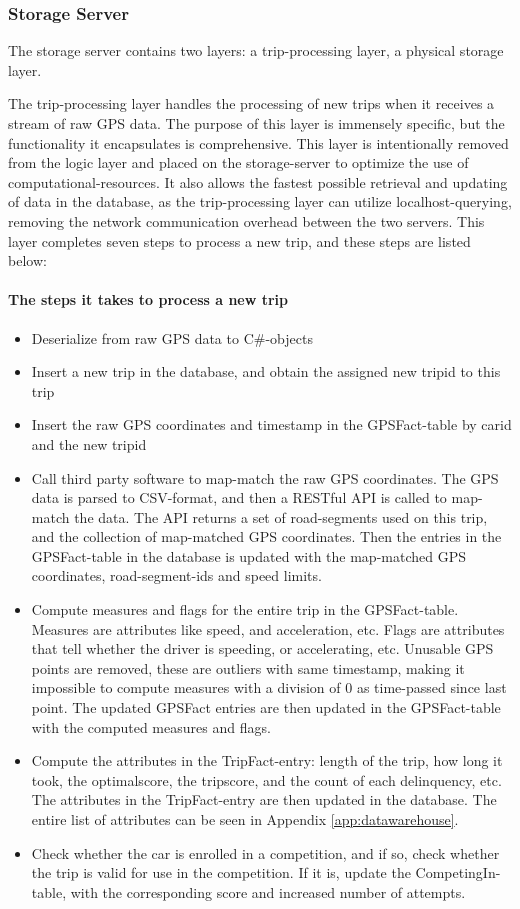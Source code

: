 \subsubsection{Storage Server}\label{subsec:storageserver}
The storage server contains two layers: a trip-processing layer, a physical storage layer.

The trip-processing layer handles the processing of new trips when it receives a stream of raw GPS data. The purpose of this layer is immensely specific, but the functionality it encapsulates is comprehensive. This layer is intentionally removed from the logic layer and placed on the storage-server to optimize the use of computational-resources. It also allows the fastest possible retrieval and updating of data in the database, as the trip-processing layer can utilize localhost-querying, removing the network communication overhead between the two servers. This layer completes seven steps to process a new trip, and these steps are listed below:

\paragraph{The steps it takes to process a new trip}
\begin{itemize}
\item Deserialize from raw GPS data to C\#-objects
\item Insert a new trip in the database, and obtain the assigned new tripid to this trip
\item Insert the raw GPS coordinates and timestamp in the GPSFact-table by carid and the new tripid
\item Call third party software to map-match the raw GPS coordinates. The GPS data is parsed to CSV-format, and then a RESTful API is called to map-match the data. The API returns a set of road-segments used on this trip, and the collection of map-matched GPS coordinates. Then the entries in the GPSFact-table in the database is updated with the map-matched GPS coordinates, road-segment-ids and speed limits.
\item Compute measures and flags for the entire trip in the GPSFact-table. Measures are attributes like speed, and acceleration, etc. Flags are attributes that tell whether the driver is speeding, or accelerating, etc. Unusable GPS points are removed, these are outliers with same timestamp, making it impossible to compute measures with a division of 0 as time-passed since last point. The updated GPSFact entries are then updated in the GPSFact-table with the computed measures and flags.
\item Compute the attributes in the TripFact-entry: length of the trip, how long it took, the optimalscore, the tripscore, and the count of each delinquency, etc. The attributes in the TripFact-entry are then updated in the database. The entire list of attributes can be seen in Appendix \ref{app:datawarehouse}.
\item Check whether the car is enrolled in a competition, and if so, check whether the trip is valid for use in the competition. If it is, update the CompetingIn-table, with the corresponding score and increased number of attempts. 
\end{itemize}

